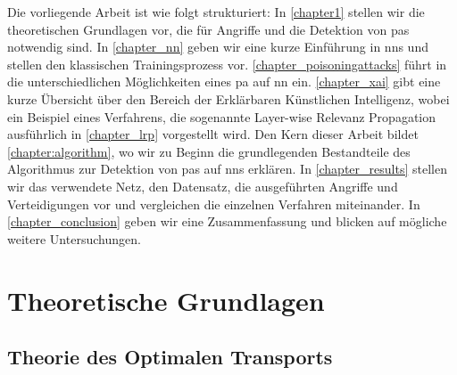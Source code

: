 \documentclass[twoside, 12pt,a4paper]{book}
\numberwithin{equation}{section}
\begin{document}
	
	\noindent Die vorliegende Arbeit ist wie folgt strukturiert: In \autoref{chapter1} stellen wir die theoretischen Grundlagen vor, die für Angriffe und die Detektion von \acp{pa} notwendig sind. In \autoref{chapter_nn} geben wir eine kurze Einführung in \acp{nn} und stellen den klassischen Trainingsprozess vor. \autoref{chapter_poisoningattacks} führt in die unterschiedlichen Möglichkeiten eines \ac{pa} auf \ac{nn} ein. \autoref{chapter_xai} gibt eine kurze Übersicht über den Bereich der Erklärbaren Künstlichen Intelligenz, wobei ein Beispiel eines Verfahrens, die sogenannte Layer-wise Relevanz Propagation ausführlich in \autoref{chapter_lrp} vorgestellt wird. Den Kern dieser Arbeit bildet \autoref{chapter:algorithm}, wo wir zu Beginn die grundlegenden Bestandteile des Algorithmus zur Detektion von \acp{pa} auf \acp{nn} erklären. In \autoref{chapter_results} stellen wir das verwendete Netz, den Datensatz, die ausgeführten Angriffe und Verteidigungen vor und vergleichen die einzelnen Verfahren miteinander.
	In \autoref{chapter_conclusion} geben wir eine Zusammenfassung und blicken auf mögliche weitere Untersuchungen.
	
	
	
	
	
	
	
	
	
	
	
	
	

	

	\chapter{Theoretische Grundlagen}\label{chapter1}
	
	\section{Theorie des Optimalen Transports}\label{ot}

	
\end{document}
